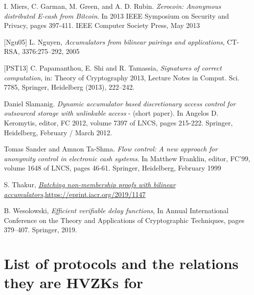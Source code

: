 \documentclass[11pt, lettersize, notitlepage, leqno, footskip=0.6cm]{article}
\newcommand{\noin}{\noindent}
\numberwithin{equation}{section}
\begin{document}
\noin [MGGR13a] I. Miers, C. Garman, M. Green, and A. D. Rubin. \textit{Zerocoin: Anonymous distributed E-cash from Bitcoin}. In 2013 IEEE Symposium on Security and Privacy, pages 397-411. IEEE Computer Society Press, May 2013 \vspace{1mm}

\noin \hypertarget{Ngu}{[Ngu05]} L. Nguyen, \textit{Accumulators from bilinear pairings and applications}, CT-RSA, 3376:275–292, 2005 \vspace{1mm}


\noin \hypertarget{PST}{[PST13]} C. Papamanthou, E. Shi and R. Tamassia, \textit{Signatures of correct computation}, in: Theory of Cryptography 2013, Lecture Notes in Comput. Sci. 7785, Springer, Heidelberg (2013), 222–242. \vspace{1mm}

\noin [Sla12] Daniel Slamanig. \textit{Dynamic accumulator based discretionary access control for outsourced storage with unlinkable access} - (short paper). In Angelos D. Keromytis, editor, FC 2012, volume 7397 of LNCS, pages 215-222. Springer, Heidelberg, February / March 2012. \vspace{1mm}

\noin [STS99b] Tomas Sander and Amnon Ta-Shma. \textit{Flow control: A new approach for anonymity control in electronic cash systems}. In Matthew Franklin, editor, FC'99, volume 1648 of LNCS, pages 46-61. Springer, Heidelberg, February 1999 \vspace{1mm}

\noin [Th19] S. Thakur, \href{https://eprint.iacr.org/2019/1147}{\textit{Batching non-membership proofs with bilinear accumulators}},\href{https://eprint.iacr.org/2019/1147}{https://eprint.iacr.org/2019/1147} \vspace{1mm}

\noin [Wes18] B. Wesolowski, \textit{Efficient verifiable delay functions}, In Annual International Conference on the Theory and Applications of Cryptographic Techniques, pages 379–407. Springer, 2019.



\normalsize


\bigskip

\appendix 

\section{\fontsize{11}{11}\selectfont  List of protocols and the relations they are HVZKs for   }
\end{document}
